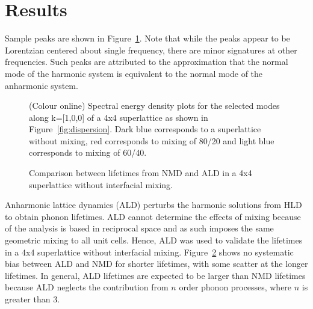 \documentclass[aps,prb,preprint,preprintnumbers,amsmath,amssymb,floatfix,superscriptaddress]{revtex4}
\begin{document}
\section{Results}
\renewcommand{\topfraction}{0.7}
\begin{figure*}[ht!]
\begin{center}
\renewcommand{\figure}{Fig.}
\caption{Dispersion of a 4x4 superlattice for modes normal to the interfaces. Red squares represent select modes for k=[1,0,0].}
\label{fig:dispersion}
\end{center}
\end{figure*}
Sample peaks are shown in Figure~\ref{fig:sed}. Note that while the peaks appear to be Lorentzian centered about single frequency, there are minor signatures at other frequencies. Such peaks are attributed to the approximation that the normal mode of the harmonic system is equivalent to the normal mode of the anharmonic system.
\begin{figure}[!h]
\begin{center}
\renewcommand{\figure}{Fig.}
\caption{(Colour online) Spectral energy density plots for the selected modes along k=[1,0,0] of a 4x4 superlattice as shown in Figure~\ref{fig:dispersion}. Dark blue corresponds to a superlattice without mixing, red corresponds to mixing of 80/20 and light blue corresponds to mixing of 60/40.}
\label{fig:sed}
\end{center}
\end{figure}
\begin{figure}%
\begin{center}
\renewcommand{\figure}{Fig.}
\caption{Comparison between lifetimes from NMD and ALD in a 4x4 superlattice without interfacial mixing.}
\label{FIG:NMD_v_ALD}
\end{center}
\end{figure}

Anharmonic lattice dynamics \cite{PhysRevB.79.064301} (ALD) perturbs the harmonic solutions from HLD to obtain phonon lifetimes. ALD cannot determine the effects of mixing because of the analysis is based in reciprocal space and as such imposes the same geometric mixing to all unit cells. Hence, ALD was used to validate the lifetimes in a 4x4 superlattice without interfacial mixing. Figure~\ref{FIG:NMD_v_ALD} shows no systematic bias between ALD and NMD for shorter lifetimes, with some scatter at the longer lifetimes. In general, ALD lifetimes are expected to be larger than NMD lifetimes because ALD neglects the contribution from $n$ order phonon processes, where $n$ is greater than 3. 
\end{document}
